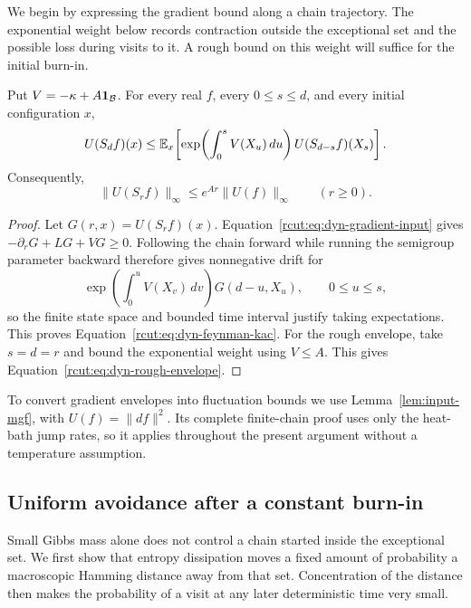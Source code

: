 We begin by expressing the gradient bound along a chain trajectory.
The exponential weight below records contraction outside the exceptional
set and the possible loss during visits to it.  A rough bound on this
weight will suffice for the initial burn-in.

\begin{lemma}
\label{rcut:lem:feynman-kac}
Put $V=-\kappa+A\mathbf 1_{\mathcal B}$.  For every real $f$, every
$0\le s\le d$, and every initial configuration $x$,
\begin{equation}
 U(S_d f)(x)
 \le \mathbb E_x\!\left[
    \exp\!\left(\int_0^s V(X_u)\,du\right)
    U(S_{d-s}f)(X_s)
 \right].
 \label{rcut:eq:dyn-feynman-kac}
\end{equation}
Consequently,
\begin{equation}
 \|U(S_r f)\|_\infty
 \le e^{Ar}\|U(f)\|_\infty
 \qquad(r\ge0).
 \label{rcut:eq:dyn-rough-envelope}
\end{equation}
\end{lemma}

\begin{proof}
Let $G(r,x)=U(S_r f)(x)$.  Equation~\eqref{rcut:eq:dyn-gradient-input}
gives $-\partial_rG+L G+VG\ge0$.  Following the chain forward while
running the semigroup parameter backward therefore gives nonnegative
drift for
\[
 \exp\!\left(\int_0^u V(X_v)\,dv\right)G(d-u,X_u),
 \qquad 0\le u\le s,
\]
so the finite state space and bounded time interval justify taking
expectations.  This proves Equation~\eqref{rcut:eq:dyn-feynman-kac}.
For the rough envelope, take $s=d=r$ and bound the exponential weight
using $V\le A$.  This gives Equation~\eqref{rcut:eq:dyn-rough-envelope}.
\end{proof}

To convert gradient envelopes into fluctuation bounds we use
Lemma~\ref{lem:input-mgf}, with $U(f)=\|df\|^2$.  Its complete
finite-chain proof uses only the heat-bath jump rates, so it applies
throughout the present argument without a temperature assumption.

\subsection{Uniform avoidance after a constant burn-in}

Small Gibbs mass alone does not control a chain started inside the
exceptional set.  We first show that entropy dissipation moves a fixed
amount of probability a macroscopic Hamming distance away from that
set.  Concentration of the distance then makes the probability of a
visit at any later deterministic time very small.

